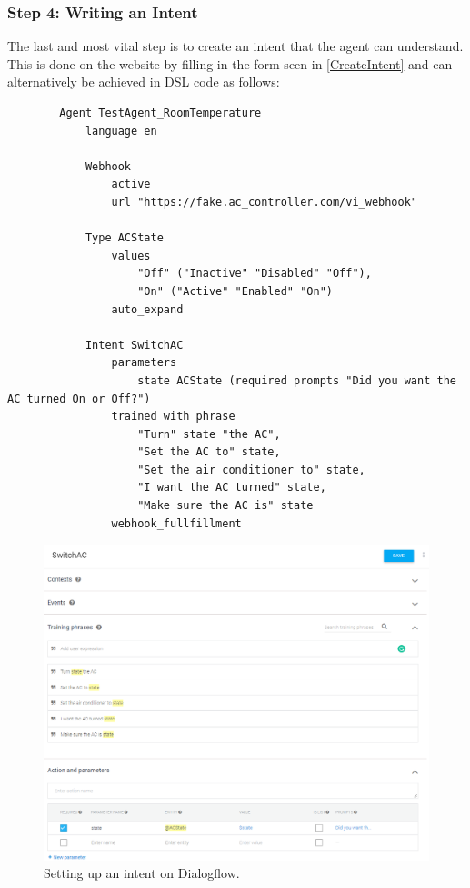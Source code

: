 \subsubsection{Step 4: Writing an Intent}
The last and most vital step is to create an intent that the agent can understand. This is done on the website by filling in the form seen in \autoref{CreateIntent} and can alternatively be achieved in DSL code as follows:
\begin{samepage}
    \begin{verbatim}
        Agent TestAgent_RoomTemperature
            language en 
                
            Webhook 
                active 
                url "https://fake.ac_controller.com/vi_webhook"

            Type ACState
                values 
                    "Off" ("Inactive" "Disabled" "Off"),
                    "On" ("Active" "Enabled" "On")
                auto_expand

            Intent SwitchAC
                parameters
                    state ACState (required prompts "Did you want the AC turned On or Off?")
                trained with phrase
                    "Turn" state "the AC",
                    "Set the AC to" state,
                    "Set the air conditioner to" state,
                    "I want the AC turned" state,
                    "Make sure the AC is" state
                webhook_fullfillment
    \end{verbatim}
\end{samepage}

\begin{figure}[ht]
    \centering
    \includegraphics[width=1\textwidth]{Thesis_Images/CreateIntent.PNG}
    \caption{Setting up an intent on Dialogflow.}
        \label{CreateIntent}
\end{figure}

